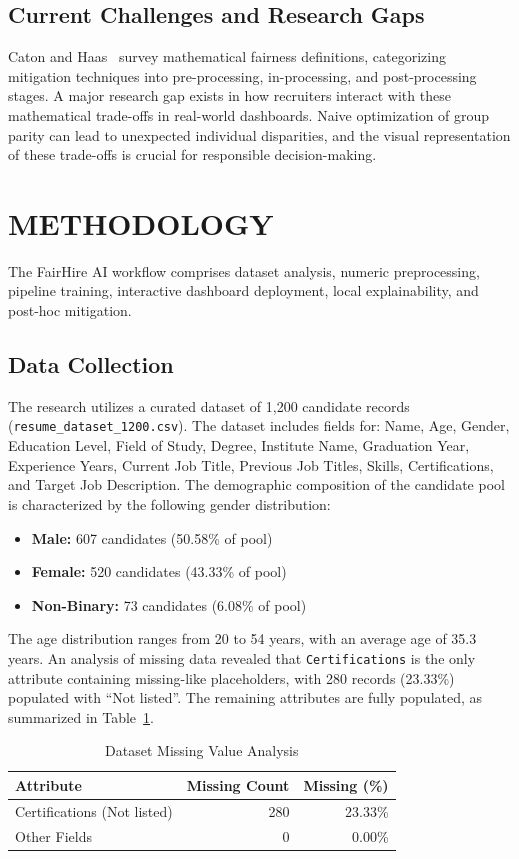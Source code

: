 \documentclass[sigconf]{acmart}
\begin{document}
\subsection{Current Challenges and Research Gaps}
Caton and Haas~\cite{caton2020} survey mathematical fairness definitions, categorizing mitigation techniques into pre-processing, in-processing, and post-processing stages. A major research gap exists in how recruiters interact with these mathematical trade-offs in real-world dashboards. Naive optimization of group parity can lead to unexpected individual disparities, and the visual representation of these trade-offs is crucial for responsible decision-making.

\section{METHODOLOGY}
The FairHire AI workflow comprises dataset analysis, numeric preprocessing, pipeline training, interactive dashboard deployment, local explainability, and post-hoc mitigation.

\subsection{Data Collection}
The research utilizes a curated dataset of 1,200 candidate records (\texttt{resume\_dataset\_1200.csv}). The dataset includes fields for: Name, Age, Gender, Education Level, Field of Study, Degree, Institute Name, Graduation Year, Experience Years, Current Job Title, Previous Job Titles, Skills, Certifications, and Target Job Description. The demographic composition of the candidate pool is characterized by the following gender distribution:
\begin{itemize}
    \item \textbf{Male:} 607 candidates (50.58\% of pool)
    \item \textbf{Female:} 520 candidates (43.33\% of pool)
    \item \textbf{Non-Binary:} 73 candidates (6.08\% of pool)
\end{itemize}
The age distribution ranges from 20 to 54 years, with an average age of 35.3 years. An analysis of missing data revealed that \texttt{Certifications} is the only attribute containing missing-like placeholders, with 280 records (23.33\%) populated with ``Not listed''. The remaining attributes are fully populated, as summarized in Table~\ref{tab:missing_data}.

\begin{table}[h]
\centering
\caption{Dataset Missing Value Analysis}
\label{tab:missing_data}
\begin{tabular}{lrr}
\toprule
\textbf{Attribute} & \textbf{Missing Count} & \textbf{Missing (\%)} \\
\midrule
Certifications (Not listed) & 280 & 23.33\% \\
Other Fields & 0 & 0.00\% \\
\bottomrule
\end{tabular}
\end{table}
\end{document}
